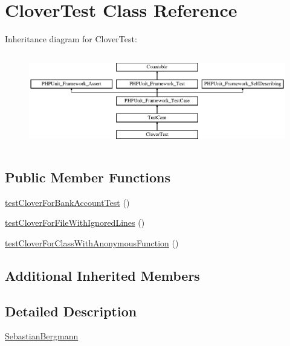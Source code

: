 \hypertarget{class_sebastian_bergmann_1_1_code_coverage_1_1_report_1_1_clover_test}{}\section{Clover\+Test Class Reference}
\label{class_sebastian_bergmann_1_1_code_coverage_1_1_report_1_1_clover_test}
Inheritance diagram for Clover\+Test\+:\begin{figure}[H]
\begin{center}
\leavevmode
\includegraphics[height=4.129793cm]{class_sebastian_bergmann_1_1_code_coverage_1_1_report_1_1_clover_test}
\end{center}
\end{figure}
\subsection*{Public Member Functions}
\begin{DoxyCompactItemize}
\item 
\mbox{\hyperlink{class_sebastian_bergmann_1_1_code_coverage_1_1_report_1_1_clover_test_a4db290781d52ac36c620bcdb18c921e6}{test\+Clover\+For\+Bank\+Account\+Test}} ()
\item 
\mbox{\hyperlink{class_sebastian_bergmann_1_1_code_coverage_1_1_report_1_1_clover_test_a1eb3f542f92c0560bd5d33e9ba38de22}{test\+Clover\+For\+File\+With\+Ignored\+Lines}} ()
\item 
\mbox{\hyperlink{class_sebastian_bergmann_1_1_code_coverage_1_1_report_1_1_clover_test_a909a6f76fc9502c1309aa57ce8774e15}{test\+Clover\+For\+Class\+With\+Anonymous\+Function}} ()
\end{DoxyCompactItemize}
\subsection*{Additional Inherited Members}


\subsection{Detailed Description}
\mbox{\hyperlink{namespace_sebastian_bergmann}{Sebastian\+Bergmann}} 

